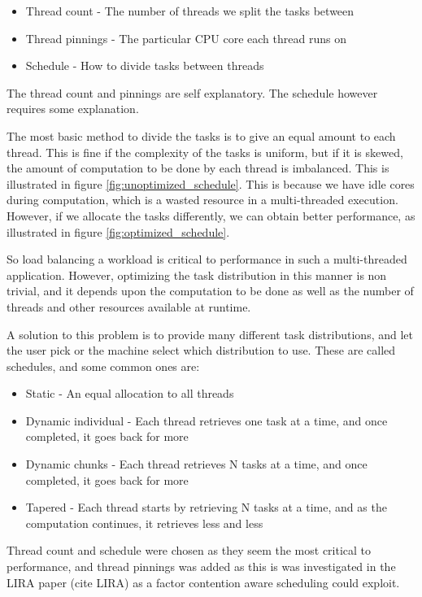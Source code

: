 \begin{itemize}
	\item Thread count - The number of threads we split the tasks between
	\item Thread pinnings - The particular CPU core each thread runs on
	\item Schedule - How to divide tasks between threads
\end{itemize}

The thread count and pinnings are self explanatory. The schedule however requires some explanation.

The most basic method to divide the tasks is to give an equal amount to each thread. This is fine if the complexity of the tasks is uniform, but if it is skewed, the amount of computation to be done by each thread is imbalanced. This is illustrated in figure \ref{fig:unoptimized_schedule}. This is because we have idle cores during computation, which is a wasted resource in a multi-threaded execution. However, if we allocate the tasks differently, we can obtain better performance, as illustrated in figure \ref{fig:optimized_schedule}.

So load balancing a workload is critical to performance in such a multi-threaded application. However, optimizing the task distribution in this manner is non trivial, and it depends upon the computation to be done as well as the number of threads and other resources available at runtime.

A solution to this problem is to provide many different task distributions, and let the user pick or the machine select which distribution to use. These are called schedules, and some common ones are:

\begin{itemize}
	\item Static - An equal allocation to all threads
	\item Dynamic individual - Each thread retrieves one task at a time, and once completed, it goes back for more
	\item Dynamic chunks - Each thread retrieves N tasks at a time, and once completed, it goes back for more
	\item Tapered - Each thread starts by retrieving N tasks at a time, and as the computation continues, it retrieves less and less
\end{itemize}

Thread count and schedule were chosen as they seem the most critical to performance, and thread pinnings was added as this is was investigated in the LIRA paper (cite LIRA) as a factor contention aware scheduling could exploit.

